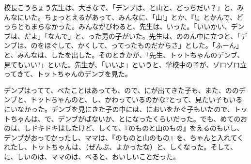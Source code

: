 {校長}{こうちょう}先生は、大きなで、「デンブは、と山と、どっちだい？」と、みんなにいた。ちょっとえるがあって、みんなに、「山!」とか、『!』とかんで、どっちともまらなかった。みんながびわると、先生は、いった。「いいかい、デンブは、だよ」「なんで」と、った男の子がいた。先生は、ののん中に立つと、「デンブは、のをほぐして、かくして、ってったものだからさ」とした。「ふーん」と、みんなは、したを出した。そのときかが、「先生、トットちゃんのデンブ、見てもいい?」といた。先生が、「いいよ」というと、学校中の子が、ゾロゾロ立ってきて、トットちゃんのデンブを見た。

デンブはってて、べたことはあっても、ので、にが出てきた子も、また、ののデンブと、トットちゃんのと、し、かわっているのかな?とって、見たい子もいるにいなかった。デンブを見にきた子の中には、においをかぐ子もいたので、トットちゃんは、で、デンブがばないか、とになったくらいだった。でも、めてのおのは、しドキドキはしたけど、しくて、『のものと山のもの』をえるのもいし、デンブがおってかったし、ママは、『のものと山のもの』を、ちゃんと入れてくれたし、トットちゃんは、（ぜんぶ、よかったな）と、しくなった。そして、に、しいのは、ママのは、べると、おいしいことだった。


